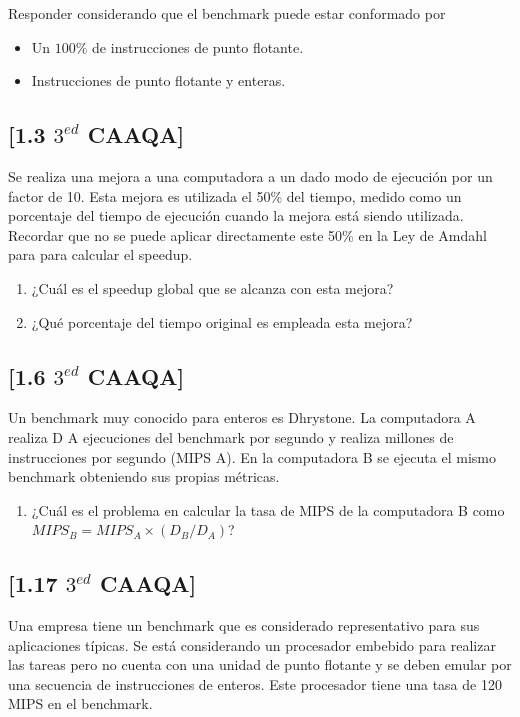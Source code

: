 Responder considerando que el benchmark puede estar conformado por 
	
\begin{itemize}
    \item Un $100\%$ de instrucciones de punto flotante.
    \item Instrucciones de punto flotante y enteras.
\end{itemize}


\subsection{[1.3 $3^{ed}$ CAAQA]}
Se realiza una mejora a una computadora a un dado modo de ejecución por un factor de 10. Esta mejora es utilizada el 50\% del tiempo, medido como un porcentaje del tiempo de ejecución cuando la mejora está siendo utilizada. Recordar que no se puede aplicar directamente este 50\% en la Ley de Amdahl para para calcular el speedup.

\begin{enumerate}
 \item ¿Cuál es el speedup global que se alcanza con esta mejora?
 \item ¿Qué porcentaje del tiempo original es empleada esta mejora?
\end{enumerate}


\subsection{[1.6 $3^{ed}$ CAAQA]}
Un benchmark muy conocido para enteros es Dhrystone. La computadora A realiza D A ejecuciones del benchmark por segundo y realiza millones de instrucciones por segundo (MIPS A). En la computadora B se ejecuta el mismo benchmark obteniendo sus propias métricas.

\begin{enumerate}
 \item ¿Cuál es el problema en calcular la tasa de MIPS de la computadora B como $MIPS_B = MIPS_A \times (D_B / D_A )$?
\end{enumerate}



\subsection{[1.17 $3^{ed}$ CAAQA]}
Una empresa tiene un benchmark que es considerado representativo para sus aplicaciones típicas. Se está considerando un procesador embebido para realizar las tareas pero no cuenta con una unidad de punto flotante y se deben emular por una secuencia de instrucciones de enteros. Este procesador tiene una tasa de 120 MIPS en el benchmark.

